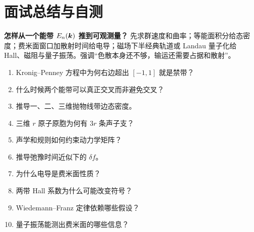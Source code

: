 \section{面试总结与自测}
\begin{interviewbox}
\textbf{怎样从一个能带 $E_n(\bm{k})$ 推到可观测量？}
先求群速度和曲率；等能面积分给态密度；费米面窗口加散射时间给电导；磁场下半经典轨道或 Landau 量子化给 Hall、磁阻与量子振荡。强调“色散本身还不够，输运还需要占据和散射”。
\end{interviewbox}
\begin{selftestbox}
\begin{enumerate}
\item Kronig--Penney 方程中为何右边超出 $[-1,1]$ 就是禁带？
\item 什么时候两个能带可以真正交叉而非避免交叉？
\item 推导一、二、三维抛物线带边态密度。
\item 三维 $r$ 原子原胞为何有 $3r$ 条声子支？
\item 声学和规则如何约束动力学矩阵？
\item 推导弛豫时间近似下的 $\delta f$。
\item 为什么电导是费米面性质？
\item 两带 Hall 系数为什么可能改变符号？
\item Wiedemann--Franz 定律依赖哪些假设？
\item 量子振荡能测出费米面的哪些信息？
\end{enumerate}
\end{selftestbox}
